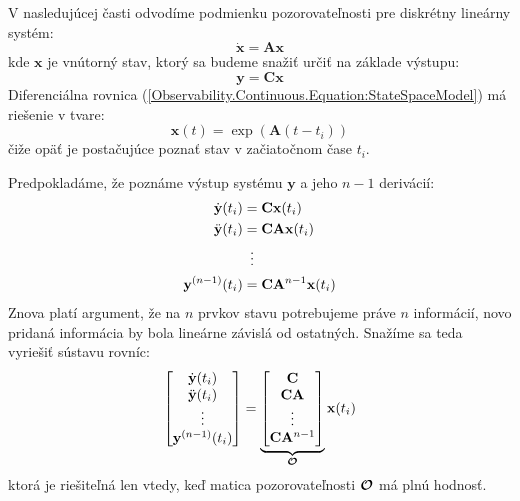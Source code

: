 \documentclass[a4paper, 10pt, ]{article}
\begin{document}
V nasledujúcej časti odvodíme podmienku pozorovateľnosti pre diskrétny lineárny systém:
\begin{equation}
    \label{Observability.Continuous.Equation:StateSpaceModel}
    \dot{\bm{x}} = \bm{A} \bm{x}
\end{equation}
kde $\bm{x}$ je vnútorný stav, ktorý sa budeme snažiť určiť na základe výstupu:
\begin{equation}
    \label{Observability.Continuous.Equation:Output}
    \bm{y} = \bm{C} \bm{x}
\end{equation}
Diferenciálna rovnica (\ref{Observability.Continuous.Equation:StateSpaceModel}) má riešenie v tvare:
\begin{equation}
    \bm{x}(t) = \exp \left( \bm{A} (t - t_i) \right)
\end{equation}
čiže opäť je postačujúce poznať stav v začiatočnom čase $t_i$.

Predpokladáme, že poznáme výstup systému $\bm{y}$ a jeho $n - 1$ derivácií:
\begin{subequations}
    \label{Observability.Continuous.Equation:OutputSystem}
    \begin{align}
        \dot{\bm{y}}(t_i)     &= \bm{C} \bm{x}(t_i)                \\
        \ddot{\bm{y}}(t_i)    &= \bm{C} \bm{A} \bm{x}(t_i)         \\
        &\vdotswithin{=}                                           \\
        \bm{y}^{(n - 1)}(t_i) &= \bm{C} \bm{A}^{n - 1} \bm{x}(t_i)
    \end{align}
\end{subequations}
Znova platí argument, že na $n$ prvkov stavu potrebujeme práve $n$ informácií, novo pridaná informácia by bola lineárne závislá od ostatných. Snažíme sa teda vyriešiť sústavu rovníc:
\begin{equation}
    \label{Observability.Continuous.Equation:OutputSystemMatrix}
    \begin{bmatrix}
        \dot{\mathbf{y}}(t_i)     \\
        \ddot{\mathbf{y}}(t_i)    \\
        \vdots                \\
        \mathbf{y}^{(n - 1)}(t_i)
    \end{bmatrix} = 
    \underbrace{
        \begin{bmatrix}
            \mathbf{C}                \\
            \mathbf{C} \mathbf{A}         \\
            \vdots                \\
            \mathbf{C} \mathbf{A}^{n - 1} \\
        \end{bmatrix}
    }_{\boldsymbol{\mathcal{O}}}
    \mathbf{x}(t_i)
\end{equation}
ktorá je riešiteľná len vtedy, keď matica pozorovateľnosti $\boldsymbol{\mathcal{O}}$ má plnú hodnosť.
\end{document}
